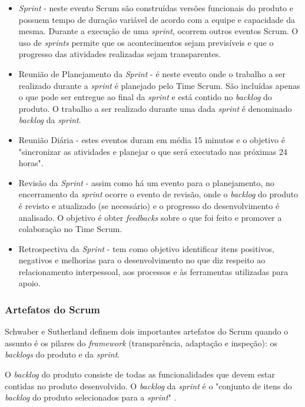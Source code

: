 \begin{itemize}
\item \textit{Sprint} - neste evento Scrum são construídas versões funcionais do produto e possuem tempo de duração variável de acordo com a equipe e capacidade da mesma. Durante a execução de uma \textit{sprint}, ocorrem outros eventos Scrum. O uso de \textit{sprints} permite que os acontecimentos sejam previsíveis e que o progresso das atividades realizadas sejam transparentes.

\item Reunião de Planejamento da \textit{Sprint} - é neste evento onde o trabalho a ser realizado durante a \textit{sprint} é planejado pelo Time Scrum. São incluídas apenas o que pode ser entregue ao final da \textit{sprint} e está contido no \textit{backlog} do produto. O trabalho a ser realizado durante uma dada \textit{sprint} é denominado \textit{backlog} da \textit{sprint}.

\item Reunião Diária - estes eventos duram em média 15 minutos e o objetivo é "sincronizar as atividades e planejar o que será executado nas próximas 24 horas".

\item Revisão da \textit{Sprint} - assim como há um evento para o planejamento, no encerramento da \textit{sprint} ocorre o evento de revisão, onde o \textit{backlog} do produto é revisto e atualizado (se necessário) e o progresso do desenvolvimento é analisado. O objetivo é obter \textit{feedbacks} sobre o que foi feito e promover a colaboração no Time Scrum.

\item Retrospectiva da \textit{Sprint} - tem como objetivo identificar itens positivos, negativos e melhorias para o desenvolvimento no que diz respeito ao relacionamento interpessoal, aos processos e às ferramentas utilizadas para apoio.

\end{itemize}

\subsubsection{Artefatos do Scrum}
Schwaber e Sutherland \cite{schwaber_guia_2013} definem dois importantes artefatos do Scrum quando o assunto é os pilares do \textit{framework} (transparência, adaptação e inspeção): os \textit{backlogs} do produto e da \textit{sprint}. 

O \textit{backlog} do produto consiste de todas as funcionalidades que devem estar contidas no produto desenvolvido. O \textit{backlog} da \textit{sprint} é o "conjunto de itens do \textit{backlog} do produto selecionados para a \textit{sprint}" \cite{schwaber_guia_2013}.

